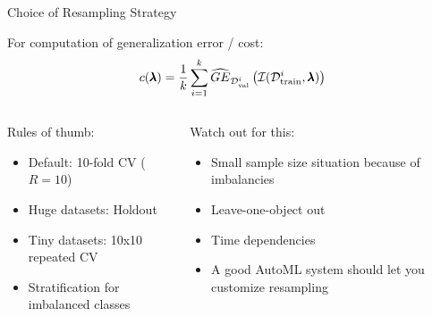 \begin{frame}{Choice of Resampling Strategy}
  
  For computation of generalization error / cost:
  \begin{equation}
    c(\pmb{\lambda}) = \frac{1}{k}\sum_{i = 1}^k \widehat{GE}_{\mathcal{D}_{\text{val}}^i}\left(\mathcal{I}(\mathcal{D}_{\text{train}}^i, \pmb{\lambda})\right)
  \end{equation}

  \vspace{1em}
  \begin{columns}
    \begin{column}{0.5\textwidth}
    Rules of thumb:
    \begin{itemize}
      \item Default: 10-fold CV ($R=10$)
      \item Huge datasets: Holdout
      \item Tiny datasets: 10x10 repeated CV
      \item Stratification for imbalanced classes
    \end{itemize}
    \end{column}
    
    \begin{column}{0.5\textwidth}
 Watch out for this:       
    \begin{itemize}
      \item Small sample size situation because of imbalancies    
      \item Leave-one-object out
      \item Time dependencies
      \item A good AutoML system should let you customize resampling
    \end{itemize}
    \end{column}
    \end{columns}
    
\end{frame}


